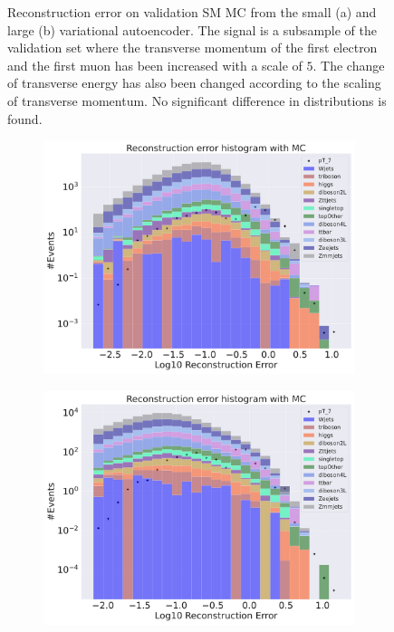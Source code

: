 \begin{figure}[H]
\begin{subfigure}{.45\textwidth}
        \caption{ }
        \label{fig:VAE_big_pt_5}
    \end{subfigure}
    \hfill 
    \caption[VAE | Reconstruction error $p_T$ altering of 5]{Reconstruction error on validation SM MC from the small (a) and large (b) variational autoencoder. The signal is a subsample of the validation 
    set where the transverse momentum of the first electron and the first muon has been increased with a scale of $5$. The change of transverse 
    energy has also been changed according to the scaling of transverse momentum.  No significant difference in distributions is found.  }
    \label{fig:VAE_big_small_pt_5}
\end{figure}


\begin{figure}[H]
    \centering
    \begin{subfigure}{.45\textwidth}
        \includegraphics[width=\textwidth]{Figures/VAE_testing/small/b_data_recon_big_rm3_feats_sig_pT_7.pdf}
        \caption{}
        \label{fig:VAE_small_pt_7}
    \end{subfigure}
    \hfill 
    \begin{subfigure}{.45\textwidth}
        \includegraphics[width=\textwidth]{Figures/VAE_testing/big/b_data_recon_big_rm3_feats_sig_pT_7.pdf}

\end{subfigure}
\end{figure}
